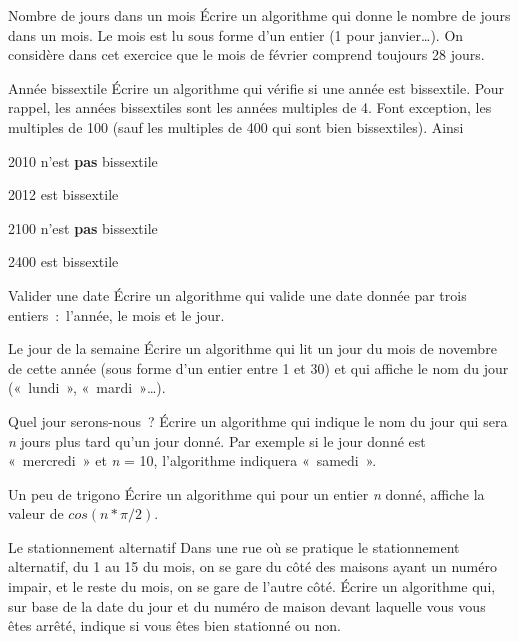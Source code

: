 \begin{Exercice}{Nombre de jours dans un mois}
Écrire un algorithme qui donne le nombre de jours dans un mois. Le mois
est lu sous forme d’un entier (1 pour janvier\dots).
On considère dans cet exercice que le mois de février
comprend toujours 28 jours.
\end{Exercice}


\begin{Exercice}{Année bissextile}
Écrire un algorithme qui vérifie si une année est bissextile. Pour
rappel, les années bissextiles sont les années multiples de 4. Font
exception, les multiples de 100 (sauf les multiples de 400 qui sont
bien bissextiles). Ainsi

\begin{liste}
\item {
2010 n’est \textbf{pas} bissextile}
\item {
2012 est bissextile}
\item {
2100 n’est \textbf{pas} bissextile}
\item {
2400 est bissextile}
\end{liste}

\end{Exercice}

\begin{Exercice}{Valider une date}
{
Écrire un algorithme qui valide une date donnée par trois entiers~:~l’année, 
le mois et le jour.}
\end{Exercice}

\begin{Exercice}{Le jour de la semaine}
{
Écrire un algorithme qui lit un jour du mois de novembre de cette année
(sous forme d’un entier entre 1 et 30) et qui affiche le nom du jour
(«~lundi~», «~mardi~»\dots).}
\end{Exercice}

\begin{Exercice}{Quel jour serons-nous~?}
{
Écrire un algorithme qui indique le nom du jour qui sera \textit{n}
jours plus tard qu’un jour donné. Par exemple si le jour donné est 
«~mercredi~» et \textit{n} = 10, l’algorithme indiquera «~samedi~».}
\end{Exercice}

\begin{Exercice}{Un peu de trigono}
Écrire un algorithme qui pour un entier \textit{n} donné, affiche la
valeur de $cos(n * \pi/2)$.
\end{Exercice}

\begin{Exercice}{Le stationnement alternatif}
{
Dans une rue où se pratique le stationnement alternatif, du 1 au 15 du
mois, on se gare du côté des maisons ayant un numéro impair, et le
reste du mois, on se gare de l’autre côté. Écrire un
algorithme qui, sur base de la date du jour et du numéro de maison
devant laquelle vous vous êtes arrêté, indique si vous êtes bien
stationné ou non. }
\end{Exercice}
